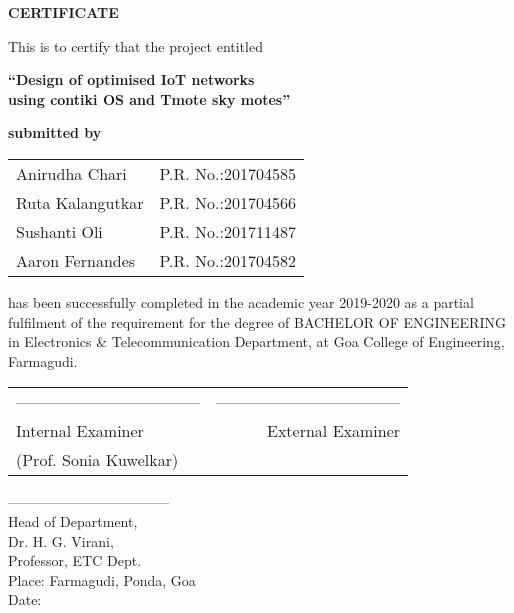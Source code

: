 \begin{center}
\begin{Huge}
{\bfseries CERTIFICATE}\\
\end{Huge}
\vspace{1cm}
{\normalsize This is to certify that the project entitled}\\
\vspace{0.3cm}
\begin{large}
{\bfseries ``Design of optimised IoT networks\\using contiki OS and Tmote sky motes''}\\
\end{large}
\vspace{0.3cm}
{\bfseries submitted by}\\
\vspace{0.8cm}
\begin{table}[H]
\normalsize
\bfseries
\begin{center}
\begin{tabular}{ll}
Anirudha Chari \hspace{1cm} & P.R. No.:201704585\\
Ruta Kalangutkar \hspace{1cm} & P.R. No.:201704566\\
Sushanti Oli\hspace{1cm} & P.R. No.:201711487\\
Aaron Fernandes\hspace{1cm} & P.R. No.:201704582\\
\end{tabular}
\end{center}
\end{table}
\end{center}
\noindent has been successfully completed in the academic year 2019-2020 as a partial fulfilment of the requirement for the degree of BACHELOR OF ENGINEERING in Electronics \& Telecommunication Department, at Goa College of Engineering, Farmagudi.\\
\vspace{1.3cm}
\begin{table}[H]
\begin{tabular}{lr}
\noindent ----------------------------------- & \hspace{6cm} ----------------------------------- \\
Internal Examiner & External Examiner\\
(Prof. Sonia Kuwelkar)&\\
\end{tabular}
\end{table}
\noindent -----------------------------------\\
Head of Department,\\
Dr. H. G. Virani,\\
Professor, ETC Dept.\\

\vspace{0.9cm}
\noindent Place: Farmagudi, Ponda, Goa\\
\noindent Date: 
\newpage